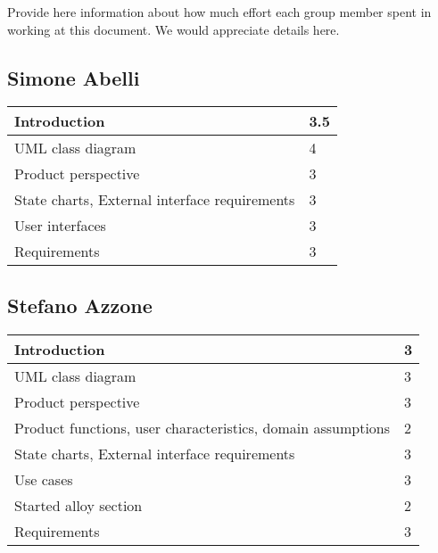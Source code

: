 Provide here information about how much effort each group member spent in working at this document. We would appreciate details here.\\

\subsection{Simone Abelli}
\begin{tabular} { | m{5cm} | m{1cm} | }
	\hline
	Introduction & 3.5\\
	\hline
	UML class diagram & 4\\
	\hline
	Product perspective & 3\\
	\hline
	State charts, External interface requirements & 3\\
	\hline
	User interfaces & 3\\
	\hline
	Requirements & 3\\
	\hline
\end{tabular}

\subsection{Stefano Azzone}
\begin{tabular} { | m{5cm} | m{1cm} | }
	\hline
	Introduction & 3\\
	\hline
	UML class diagram & 3\\
	\hline
	Product perspective & 3\\
	\hline
	Product functions, user characteristics, domain assumptions & 2\\
	\hline
	State charts, External interface requirements & 3\\
	\hline
	Use cases & 3\\
	\hline
	Started alloy section & 2\\
	\hline
	Requirements & 3\\
	\hline
\end{tabular}